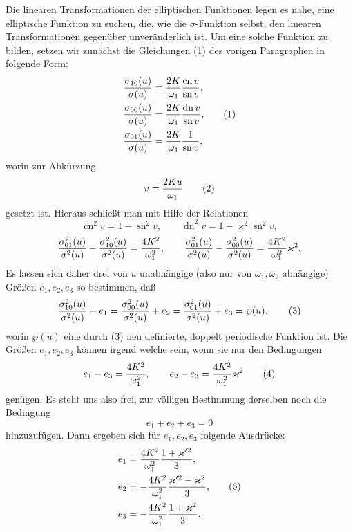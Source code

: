 \documentclass[11pt]{article}
\providecommand{\sn}{\operatorname{sn}}
\providecommand{\cn}{\operatorname{cn}}
\providecommand{\dn}{\operatorname{dn}}
\begin{document}
Die linearen Transformationen der elliptischen Funktionen legen es nahe, eine elliptische Funktion zu suchen, die, wie die $\sigma$-Funktion selbst, den linearen Transformationen gegenüber unveränderlich ist. Um eine solche Funktion zu bilden, setzen wir zunächst die Gleichungen (1) des vorigen Paragraphen in folgende Form:
\begin{equation}
\begin{aligned}
{\sigma_{10}(u)\over\sigma(u)}&={2K\over\omega_1}{\cn v\over\sn v},\\
{\sigma_{00}(u)\over\sigma(u)}&={2K\over\omega_1}{\dn v\over\sn v},\\
{\sigma_{01}(u)\over\sigma(u)}&={2K\over\omega_1}{1\over\sn v},
\end{aligned}
\tag{1}
\end{equation}
worin zur Abkürzung
\begin{equation}
v={2Ku\over\omega_1}
\tag{2}
\end{equation}
gesetzt ist. Hieraus schließt man mit Hilfe der Relationen
\[
\cn^2v=1-\sn^2v,
\qquad
\dn^2v=1-\varkappa^2\sn^2v,
\]
\[
{\sigma_{01}^2(u)\over\sigma^2(u)}-{\sigma_{10}^2(u)\over\sigma^2(u)}={4K^2\over\omega_1^2},
\qquad
{\sigma_{01}^2(u)\over\sigma^2(u)}-{\sigma_{00}^2(u)\over\sigma^2(u)}={4K^2\over\omega_1^2}\varkappa^2,
\]
Es lassen sich daher drei von $u$ unabhängige (also nur von $\omega_1,\omega_2$ abhängige) Größen $e_1,e_2,e_3$ so bestimmen, daß
\begin{equation}
{\sigma_{10}^2(u)\over\sigma^2(u)}+e_1
={\sigma_{00}^2(u)\over\sigma^2(u)}+e_2
={\sigma_{01}^2(u)\over\sigma^2(u)}+e_3
=\wp(u),
\tag{3}
\end{equation}
worin $\wp(u)$ eine durch (3) neu definierte, doppelt periodische Funktion ist. Die Größen $e_1,e_2,e_3$ können irgend welche sein, wenn sie nur den Bedingungen
\begin{equation}
e_1-e_3={4K^2\over\omega_1^2},
\qquad
e_2-e_3={4K^2\over\omega_1^2}\varkappa^2
\tag{4}
\end{equation}
genügen. Es steht uns also frei, zur völligen Bestimmung derselben noch die Bedingung
\begin{equation}
e_1+e_2+e_3=0
\tag{5}
\end{equation}
hinzuzufügen. Dann ergeben sich für $e_1,e_2,e_3$ folgende Ausdrücke:
\begin{equation}
\begin{aligned}
e_1&={4K^2\over\omega_1^2}{1+\varkappa'^2\over3},\\
e_2&=-{4K^2\over\omega_1^2}{\varkappa'^2-\varkappa^2\over3},\\
e_3&=-{4K^2\over\omega_1^2}{1+\varkappa^2\over3}.
\end{aligned}
\tag{6}
\end{equation}
\end{document}
